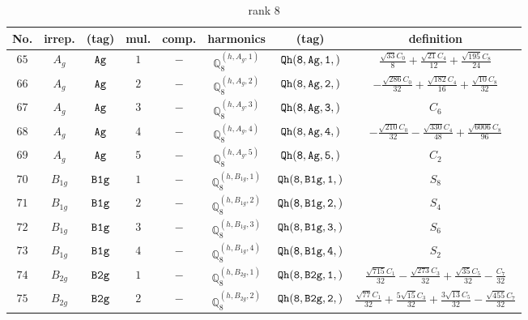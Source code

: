 \documentclass[fleqn,8pt]{jsarticle}
\begin{document}
\begin{table}[ht!]
\begin{center}
\caption{rank 8}
\renewcommand{\arraystretch}{1.3}
\begin{tabular}{cccccccc} \hline \hline
No. & irrep. & (tag) & mul. & comp. & harmonics & (tag) & definition \\ \hline
$ 65 $ & $ A_{g} $ & $ {\tt Ag} $ & $ 1 $ & $ - $ & $ \mathbb{Q}_{8}^{(h,A_{g},1)} $ & $ {\tt Qh(8,Ag,1,)} $ & $ \frac{\sqrt{33} C_{0}}{8} + \frac{\sqrt{21} C_{4}}{12} + \frac{\sqrt{195} C_{8}}{24} $ \\
$ 66 $ & $ A_{g} $ & $ {\tt Ag} $ & $ 2 $ & $ - $ & $ \mathbb{Q}_{8}^{(h,A_{g},2)} $ & $ {\tt Qh(8,Ag,2,)} $ & $ - \frac{\sqrt{286} C_{0}}{32} + \frac{\sqrt{182} C_{4}}{16} + \frac{\sqrt{10} C_{8}}{32} $ \\
$ 67 $ & $ A_{g} $ & $ {\tt Ag} $ & $ 3 $ & $ - $ & $ \mathbb{Q}_{8}^{(h,A_{g},3)} $ & $ {\tt Qh(8,Ag,3,)} $ & $ C_{6} $ \\
$ 68 $ & $ A_{g} $ & $ {\tt Ag} $ & $ 4 $ & $ - $ & $ \mathbb{Q}_{8}^{(h,A_{g},4)} $ & $ {\tt Qh(8,Ag,4,)} $ & $ - \frac{\sqrt{210} C_{0}}{32} - \frac{\sqrt{330} C_{4}}{48} + \frac{\sqrt{6006} C_{8}}{96} $ \\
$ 69 $ & $ A_{g} $ & $ {\tt Ag} $ & $ 5 $ & $ - $ & $ \mathbb{Q}_{8}^{(h,A_{g},5)} $ & $ {\tt Qh(8,Ag,5,)} $ & $ C_{2} $ \\
$ 70 $ & $ B_{1g} $ & $ {\tt B1g} $ & $ 1 $ & $ - $ & $ \mathbb{Q}_{8}^{(h,B_{1g},1)} $ & $ {\tt Qh(8,B1g,1,)} $ & $ S_{8} $ \\
$ 71 $ & $ B_{1g} $ & $ {\tt B1g} $ & $ 2 $ & $ - $ & $ \mathbb{Q}_{8}^{(h,B_{1g},2)} $ & $ {\tt Qh(8,B1g,2,)} $ & $ S_{4} $ \\
$ 72 $ & $ B_{1g} $ & $ {\tt B1g} $ & $ 3 $ & $ - $ & $ \mathbb{Q}_{8}^{(h,B_{1g},3)} $ & $ {\tt Qh(8,B1g,3,)} $ & $ S_{6} $ \\
$ 73 $ & $ B_{1g} $ & $ {\tt B1g} $ & $ 4 $ & $ - $ & $ \mathbb{Q}_{8}^{(h,B_{1g},4)} $ & $ {\tt Qh(8,B1g,4,)} $ & $ S_{2} $ \\
$ 74 $ & $ B_{2g} $ & $ {\tt B2g} $ & $ 1 $ & $ - $ & $ \mathbb{Q}_{8}^{(h,B_{2g},1)} $ & $ {\tt Qh(8,B2g,1,)} $ & $ \frac{\sqrt{715} C_{1}}{32} - \frac{\sqrt{273} C_{3}}{32} + \frac{\sqrt{35} C_{5}}{32} - \frac{C_{7}}{32} $ \\
$ 75 $ & $ B_{2g} $ & $ {\tt B2g} $ & $ 2 $ & $ - $ & $ \mathbb{Q}_{8}^{(h,B_{2g},2)} $ & $ {\tt Qh(8,B2g,2,)} $ & $ \frac{\sqrt{77} C_{1}}{32} + \frac{5 \sqrt{15} C_{3}}{32} + \frac{3 \sqrt{13} C_{5}}{32} - \frac{\sqrt{455} C_{7}}{32} $ \\

\end{tabular}
\end{center}
\end{table}
\end{document}
